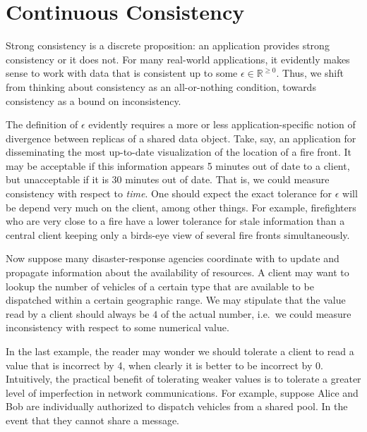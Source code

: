 \documentclass[]             %
{NASA}                       %
\theoremstyle{definition}
\begin{document}
\newpage

\hypertarget{continuous-consistency}{%
  \section{Continuous Consistency}\label{continuous-consistency}}

\label{sec:continuous-consistency}

Strong consistency is a discrete proposition: an application provides
strong consistency or it does not. For many real-world applications, it
evidently makes sense to work with data that is consistent up to some
\(\epsilon \in \mathbb{R}^{\geq 0}\). Thus, we shift from thinking about
consistency as an all-or-nothing condition, towards consistency as a
bound on inconsistency.

The definition of \(\epsilon\) evidently requires a more or less
application-specific notion of divergence between replicas of a shared
data object. Take, say, an application for disseminating the most
up-to-date visualization of the location of a fire front. It may be
acceptable if this information appears 5 minutes out of date to a
client, but unacceptable if it is 30 minutes out of date. That is, we
could measure consistency with respect to \emph{time}. One should expect
the exact tolerance for \(\epsilon\) will be depend very much on the
client, among other things. For example, firefighters who are very close
to a fire have a lower tolerance for stale information than a central
client keeping only a birds-eye view of several fire fronts
simultaneously.

Now suppose many disaster-response agencies coordinate with to update
and propagate information about the availability of resources. A client
may want to lookup the number of vehicles of a certain type that are
available to be dispatched within a certain geographic range. We may
stipulate that the value read by a client should always be \(4\) of the
actual number, i.e.~we could measure inconsistency with respect to some
numerical value.

In the last example, the reader may wonder we should tolerate a client
to read a value that is incorrect by 4, when clearly it is better to be
incorrect by 0. Intuitively, the practical benefit of tolerating weaker
values is to tolerate a greater level of imperfection in network
communications. For example, suppose Alice and Bob are individually
authorized to dispatch vehicles from a shared pool. In the event that
they cannot share a message.
\end{document}
